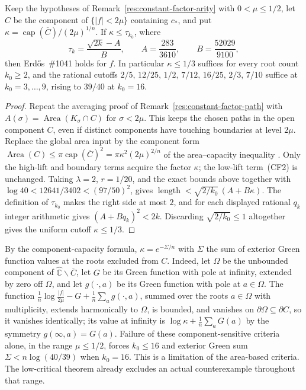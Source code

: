 \begin{remark}
\label{res:constant-factor-capacity}
Keep the hypotheses of Remark~\ref{res:constant-factor-arity} with
$0<\mu\le1/2$, let $C$ be the component of $\{|f|<2\mu\}$ containing $c_*$, and
put $\kappa=\operatorname{cap}(\overline C)/(2\mu)^{1/n}$.  If
$\kappa\le\tau_{k_0}$, where
\[
 \tau_k=\frac{\sqrt{2k}-A}{B},\qquad
 A=\frac{283}{3610},\qquad B=\frac{52029}{9100},
\]
then Erd\H{o}s~\#1041 holds for $f$. In particular $\kappa\le1/3$ suffices for
every root count $k_0\ge2$, and the rational cutoffs
$2/5,\,12/25,\,1/2,\,7/12,\,16/25,\,2/3,\,7/10$ suffice at
$k_0=3,\ldots,9$, rising to $39/40$ at $k_0=16$.
\end{remark}


\begin{proof}
Repeat the averaging proof of Remark~\ref{res:constant-factor-path} with
$A(\sigma)=\operatorname{Area}(K_\sigma\cap C)$ for $\sigma<2\mu$.
This keeps the chosen paths in the open component $C$, even if distinct
components have touching boundaries at level $2\mu$. Replace the global
area input by the component form
$\operatorname{Area}(C)\le\pi\operatorname{cap}(\overline C)^2
 =\pi\kappa^2(2\mu)^{2/n}$ of the area--capacity inequality
\cite[Theorem~6]{crane}.  Only the high-lift and boundary terms acquire the
factor $\kappa$; the low-lift term~(CF2) is unchanged.  Taking $\lambda=2$,
$r=1/20$, and the exact bounds above together with
$\log40<12641/3402<(97/50)^2$, gives
$\operatorname{length}<\sqrt{2/k_0}\,(A+B\kappa)$.  The definition of
$\tau_{k_0}$ makes the right side at most $2$, and for each displayed rational
$q_k$ integer arithmetic gives $(A+Bq_k)^2<2k$.  Discarding
$\sqrt{2/k_0}\le1$ altogether gives the uniform cutoff $\kappa\le1/3$.
\end{proof}

By the component-capacity formula, $\kappa=e^{-\Sigma/n}$ with $\Sigma$ the sum
of exterior Green function values at the roots excluded from $C$.  Indeed, let
$\Omega$ be the unbounded component of
$\widehat{\mathbb C}\mathbin{\backslash}\overline C$,
let $G$ be its Green function with pole at infinity, extended by zero off
$\Omega$, and let $g(\cdot,a)$ be its Green function with pole at $a\in\Omega$.
The function $\frac1n\log\frac{|f|}{2\mu}-G+\frac1n\sum_a g(\cdot,a)$, summed
over the roots $a\in\Omega$ with multiplicity, extends harmonically to
$\Omega$, is bounded, and vanishes on $\partial\Omega\subseteq\partial C$, so it
vanishes identically; its value at infinity is $\log\kappa+\frac1n\sum_aG(a)$
by the symmetry $g(\infty,a)=G(a)$.  Failure of these component-sensitive
criteria alone, in the range $\mu\le1/2$, forces $k_0\le16$ and exterior
Green sum $\Sigma<n\log(40/39)$ when $k_0=16$.  This is a limitation of
the area-based criteria.  The low-critical theorem already excludes an actual
counterexample throughout that range.

